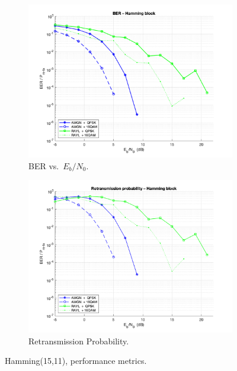 \begin{figure}[H]

    \centering
    \begin{subfigure}{0.45\textwidth}
        \includegraphics*[scale = 0.18]{Images/BlockCodeBER.png}
        \caption{BER vs.\ $E_b/N_0$.}
        \label{fig:Hamm_BER}
    \end{subfigure}
    \begin{subfigure}{0.45\textwidth}
        \includegraphics*[scale = 0.19]{Images/BlockCodeRTX.png}
        \caption{Retransmission Probability.}
        \label{fig:Pret_Sim}
    \end{subfigure}
    
    \caption{Hamming(15,11), performance metrics.}
    \label{fig:Hamm_performance}
\end{figure}


